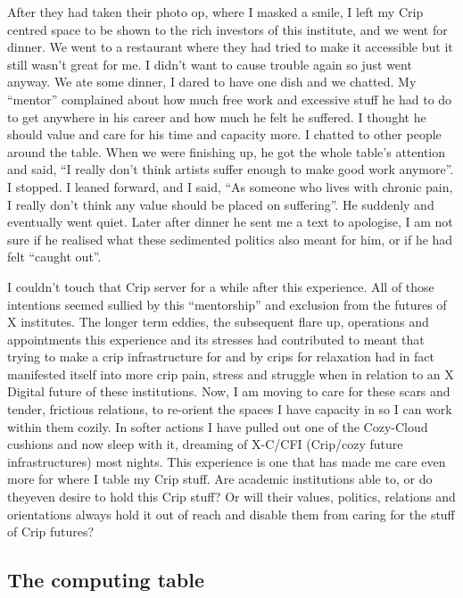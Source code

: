 After they had taken their photo op, where I masked a smile, I left my
Crip centred space to be shown to the rich investors of this institute,
and we went for dinner. We went to a restaurant where they had tried to
make it accessible but it still wasn't great for me. I didn't want to
cause trouble again so just went anyway. We ate some dinner, I dared to
have one dish and we chatted. My ``mentor'' complained about how much
free work and excessive stuff he had to do to get anywhere in his career
and how much he felt he suffered. I thought he should value and care for
his time and capacity more. I chatted to other people around the table.
When we were finishing up, he got the whole table's attention and said,
``I really don't think artists suffer enough to make good work
anymore''. I stopped. I leaned forward, and I said, ``As someone who
lives with chronic pain, I really don't think any value should be placed
on suffering''. He suddenly and eventually went quiet. Later after
dinner he sent me a text to apologise, I am not sure if he realised what
these sedimented politics also meant for him, or if he had felt ``caught
out''.

I couldn't touch that Crip server for a while after this experience. All
of those intentions seemed sullied by this ``mentorship'' and exclusion
from the futures of X institutes. The longer term eddies, the subsequent
flare up, operations and appointments this experience and its stresses
had contributed to meant that trying to make a crip infrastructure for
and by crips for relaxation had in fact manifested itself into more crip
pain, stress and struggle when in relation to an X Digital future of
these institutions. Now, I am moving to care for these scars and tender,
frictious relations, to re-orient the spaces I have capacity in so I can
work within them cozily. In softer actions I have pulled out one of the
Cozy-Cloud cushions and now sleep with it, dreaming of X-C/CFI
(Crip/cozy future infrastructures) most nights. This experience is one
that has made me care even more for where I table my Crip stuff. Are
academic institutions able to, or do theyeven desire to hold this Crip
stuff? Or will their values, politics, relations and orientations always
hold it out of reach and disable them from caring for the stuff of Crip
futures?

\hypertarget{the-computing-table}{%
\subsection[The computing
table]{\texorpdfstring{\protect\hypertarget{anchor}{}{}The computing
table}{The computing table}}\label{the-computing-table}}

